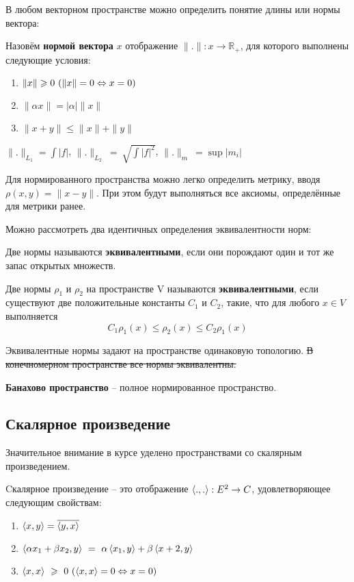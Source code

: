 	В любом векторном пространстве можно определить понятие длины или нормы вектора:
	
	\begin{defi}
		Назовём \textbf{нормой вектора} $x$ отображение $\|.\| : x \rightarrow \mathbb{R_+}$, для которого выполнены следующие условия:
		\begin{enumerate}
			\item $\|x\| \geqslant 0 ~(\|x\| = 0 \Leftrightarrow x = 0)$
			\item $\|\alpha x\| = |\alpha| \|x\|$
			\item $\|x + y\| \leq \|x\| + \|y\|$
		\end{enumerate}
	\end{defi}
	
	\example $\|.\|_{L_1} = \int {|f|}$, $\|.\|_{L_2} ~=~ \sqrt{\int {|f|^2}}$,  $\|.\|_{m} ~= \sup {|m_i|}$
	
	Для нормированного пространства можно легко определить метрику, вводя $\rho(x,y) = \|x-y\|$. При этом будут выполняться все аксиомы,
	определённые для метрики ранее.
	
	Можно рассмотреть два идентичных определения эквивалентности норм:
	
	\begin{defi}
		Две нормы называются \textbf{эквивалентными}, если они порождают один и тот же запас открытых множеств.
	\end{defi}
	
	\begin{defi}
		Две нормы $\rho_1$ и $\rho_2$ на пространстве V называются \textbf{эквивалентными}, если существуют две положительные константы 
		$C_1$ и $C_2$, такие, что для любого $x \in V$ выполняется 
		$$C_1 \rho_1(x) \leq \rho_2(x) \leq C_2 \rho_1(x)$$
	\end{defi}
	Эквивалентные нормы задают на пространстве одинаковую топологию. \sout{В конечномерном пространстве все нормы эквивалентны.}
	
	\begin{defi}
		\textbf{Банахово пространство} -- полное нормированное пространство.
	\end{defi}
	
	\subsection{Скалярное произведение}

	Значительное внимание в курсе уделено пространствами со скалярным произведением.

	\begin{defi}
		Cкалярное произведение -- это отображение $\left\langle ., . \right\rangle : E^2 \rightarrow C$, удовлетворяющее следующим свойствам:
		\begin{enumerate} 
			\item $\left\langle x, y \right\rangle = \overline{\left\langle y, x \right\rangle}$
			\item $\left\langle \alpha x_1 + \beta x_2, y \right\rangle ~= ~\alpha \left\langle x_1, y \right\rangle + \beta \left\langle x+2, y \right\rangle$
			\item $\left\langle x, x \right\rangle ~\geqslant ~0 ~(\left\langle x, x \right\rangle = 0 \Leftrightarrow x = 0)$
		\end{enumerate}
	\end{defi}

